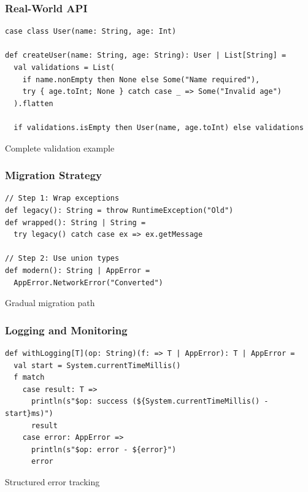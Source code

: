 \documentclass{beamer}
\begin{document}
\begin{frame}[fragile]
\frametitle{Real-World API}

\begin{lstlisting}[style=scalaStyle]
case class User(name: String, age: Int)

def createUser(name: String, age: String): User | List[String] =
  val validations = List(
    if name.nonEmpty then None else Some("Name required"),
    try { age.toInt; None } catch case _ => Some("Invalid age")
  ).flatten
  
  if validations.isEmpty then User(name, age.toInt) else validations
\end{lstlisting}

Complete validation example

\end{frame}

\begin{frame}[fragile]
\frametitle{Migration Strategy}

\begin{lstlisting}[style=scalaStyle]
// Step 1: Wrap exceptions
def legacy(): String = throw RuntimeException("Old")
def wrapped(): String | String = 
  try legacy() catch case ex => ex.getMessage

// Step 2: Use union types
def modern(): String | AppError =
  AppError.NetworkError("Converted")
\end{lstlisting}

Gradual migration path

\end{frame}

\begin{frame}[fragile]
\frametitle{Logging and Monitoring}

\begin{lstlisting}[style=scalaStyle]
def withLogging[T](op: String)(f: => T | AppError): T | AppError =
  val start = System.currentTimeMillis()
  f match
    case result: T => 
      println(s"$op: success (${System.currentTimeMillis() - start}ms)")
      result
    case error: AppError => 
      println(s"$op: error - ${error}")
      error
\end{lstlisting}

Structured error tracking

\end{frame}
\end{document}

